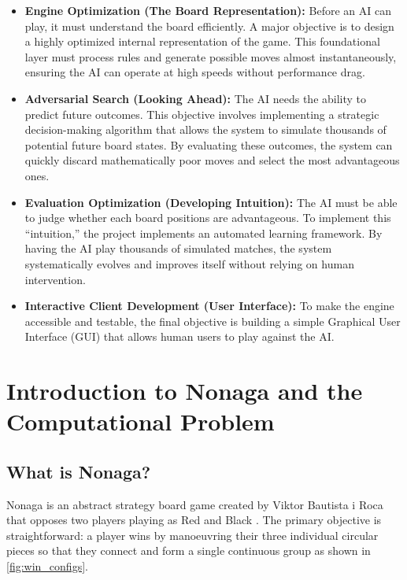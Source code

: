 \begin{itemize}
  \item \textbf{Engine Optimization (The Board Representation):} Before an AI can play, it must understand the board efficiently. A major objective is to design a highly optimized internal representation of the game. This foundational layer must process rules and generate possible moves almost instantaneously, ensuring the AI can operate at high speeds without performance drag.

  \item \textbf{Adversarial Search (Looking Ahead):} The AI needs the ability to predict future outcomes. This objective involves implementing a strategic decision-making algorithm that allows the system to simulate thousands of potential future board states. By evaluating these outcomes, the system can quickly discard mathematically poor moves and select the most advantageous ones.

  \item \textbf{Evaluation Optimization (Developing Intuition):} The AI must be able to judge whether each board positions are advantageous. To implement this ``intuition,'' the project implements an automated learning framework. By having the AI play thousands of simulated matches, the system systematically evolves and improves itself without relying on human intervention.

  \item \textbf{Interactive Client Development (User Interface):} To make the engine accessible and testable, the final objective is building a simple Graphical User Interface (GUI) that allows human users to play against the AI.

\end{itemize}


\section{Introduction to Nonaga and the Computational Problem}
\subsection{What is Nonaga?}
Nonaga is an abstract strategy board game created by Viktor Bautista i Roca that opposes two players playing as Red and Black \cite{nonaga_rules}. The primary objective is straightforward: a player wins by manoeuvring their three individual circular pieces so that they connect and form a single continuous group as shown in \cref{fig:win_configs}. \\



